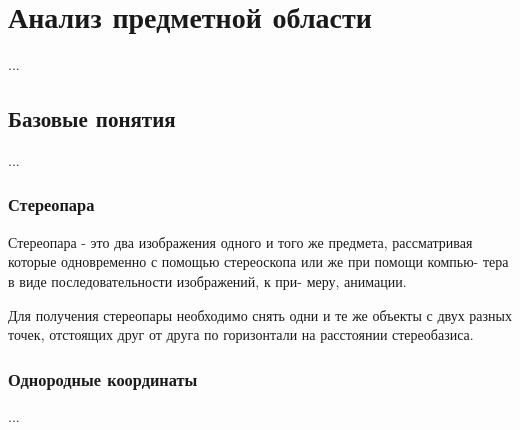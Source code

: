 \chapter{Анализ предметной области}
...
\section{Базовые понятия}
...
\subsection{Стереопара}
Стереопара - это два изображения одного и того
же предмета, рассматривая которые одновременно с
помощью стереоскопа или же при помощи компью-
тера в виде последовательности изображений, к при-
меру, анимации.

Для получения стереопары необходимо снять одни и те же объекты с двух разных точек, отстоящих друг от друга по горизонтали на расстоянии стереобазиса.
\subsection{Однородные координаты}
...
